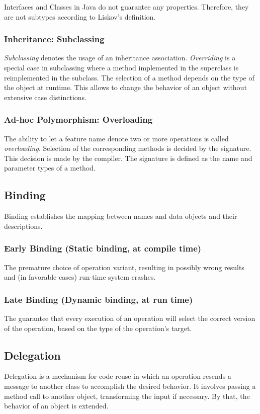 Interfaces and Classes in Java do not guarantee any properties. Therefore, they are not subtypes according to Liskov’s definition.

\subsubsection*{Inheritance: Subclassing}
\textit{Subclassing} denotes the usage of an inheritance association.
\textit{Overriding} is a special case in subclassing where a method implemented in the superclass is reimplemented in the subclass.
The selection of a method depends on the type of the object at runtime.
This allows to change the behavior of an object without extensive case distinctions.

\subsubsection*{Ad-hoc Polymorphism: Overloading}
The ability to let a feature name denote two or more operations is called \textit{overloading}.
Selection of the corresponding methods is decided by the signature.
This decision is made by the compiler.
The signature is defined as the name and parameter types of a method.


\subsection{Binding}
Binding establishes the mapping between names and data objects and their descriptions.

\subsubsection*{Early Binding (Static binding, at compile time)}
The premature choice of operation variant, resulting in possibly wrong results and (in favorable cases) run-time system crashes.

\subsubsection*{Late Binding (Dynamic binding, at run time)}
The guarantee that every execution of an operation will select the correct version of the operation, based on the type of the operation's target.

\subsection{Delegation}
Delegation is a mechanism for code reuse in which an operation resends a message to another class to accomplish the desired behavior.
It involves passing a method call to another object, transforming the input if necessary.
By that, the behavior of an object is extended.

\newpage
